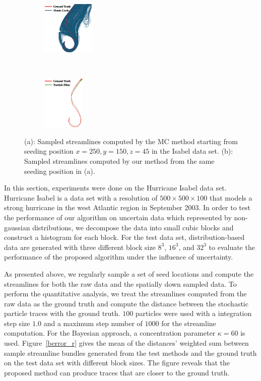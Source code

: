 \begin{figure}[!htbp]
  \centering
  \begin{subfigure}[!htbp]{0.25\textwidth}
    \centering
    \includegraphics[height=1.0in]{../figures/isabel_mc1.eps}
    \caption{}
    \label{case_4_a}
  \end{subfigure}~
  \begin{subfigure}[!htbp]{0.25\textwidth}
    \centering
    \includegraphics[height=1.0in]{../figures/isabel_smc1.eps}
    \caption{}
    \label{case_4_b}
  \end{subfigure}
  \caption{(a): Sampled streamlines computed by the MC method starting from seeding position $x=250, y=150, z=45$ in the Isabel data set. (b): Sampled streamlines computed by our method from the same seeding position in (a).}
  \label{case_4}
\end{figure}

In this section, experiments were done on the Hurricane Isabel data set. Hurricane Isabel is a data set with a resolution of $500 \times 500 \times 100$ that models a strong hurricane in the west Atlantic region in September 2003. In order to test the performance of our algorithm on uncertain data which represented by non-gaussian distributions, we decompose the data into small cubic blocks and construct a histogram for each block. For the test data set, distribution-based data are generated with three different block size $8^3$, $16^3$, and $32^3$ to evaluate the performance of the proposed algorithm under the influence of uncertainty.

As presented above, we regularly sample a set of seed locations and compute the streamlines for both the raw data and the spatially down sampled data. To perform the quantitative analysis, we treat the streamlines computed from the raw data as the ground truth and compute the distance between the stochastic particle traces with the ground truth. $100$ particles were used with a integration step size $1.0$ and a maximum step number of $1000$ for the streamline computation. For the Bayesian approach, a concentration parameter $\kappa = 60$ is used. Figure~\ref{berror_r} gives the mean of the distances' weighted sum between sample streamline bundles generated from the test methods and the ground truth on the test data set with different block sizes. The figure reveals that the proposed method can produce traces that are closer to the ground truth.


